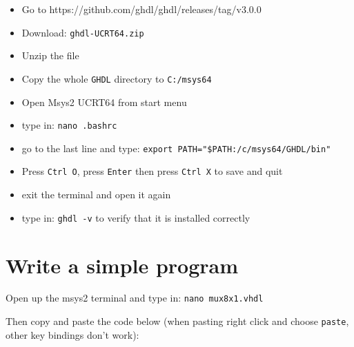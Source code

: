 \documentclass[11pt]{article}
\providecommand{\tightlist}{%
      \setlength{\itemsep}{0pt}\setlength{\parskip}{0pt}}
\begin{document}
\begin{itemize}
\tightlist
\item
  Go to https://github.com/ghdl/ghdl/releases/tag/v3.0.0
\item
  Download: \texttt{ghdl-UCRT64.zip}
\item
  Unzip the file
\item
  Copy the whole \texttt{GHDL} directory to \texttt{C:/msys64}
\item
  Open Msys2 UCRT64 from start menu
\item
  type in: \texttt{nano\ .bashrc}
\item
  go to the last line and type:
  \texttt{export\ PATH="\$PATH:/c/msys64/GHDL/bin"}
\item
  Press \texttt{Ctrl\ O}, press \texttt{Enter} then press
  \texttt{Ctrl\ X} to save and quit
\item
  exit the terminal and open it again
\item
  type in: \texttt{ghdl\ -v} to verify that it is installed correctly
\end{itemize}

    \hypertarget{write-a-simple-program}{%
\section{Write a simple program}\label{write-a-simple-program}}

Open up the msys2 terminal and type in: \texttt{nano\ mux8x1.vhdl}

Then copy and paste the code below (when pasting right click and choose
\texttt{paste}, other key bindings don't work):
\end{document}
